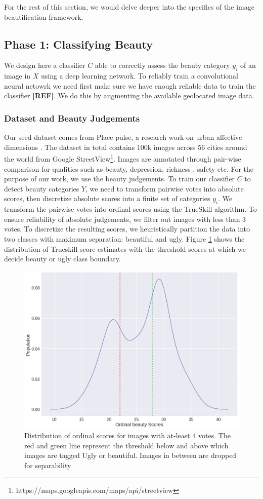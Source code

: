 For the rest of this section, we would delve deeper into the specifics of the image beautification framework. 

\subsection{Phase 1: Classifying Beauty}
We design here a classifier $C$  able to correctly assess the beauty category $y_i$ of an image in $X$ using a deep learning network. To reliably train a convolutional neural netowrk we need first make sure we have enough reliable data to train the classifier \textbf{[REF]}. We do this by augmenting the available geolocated image data. 

\subsubsection{Dataset and Beauty Judgements}
\label{sec:label}
Our seed dataset comes from Place pulse, a research work on urban affective dimensions \cite{dubey2016deep}. The dataset in total contains 100k images across 56 cities around the world from Google StreetView\footnote{https://maps.googleapis.com/maps/api/streetview}. Images are annotated through pair-wise comparison for qualities such as beauty, depression, richness , safety etc. For the purpose of our work, we use the beauty judgements. To train our classifier $C$ to detect beauty %
categories $Y$, we need to transform pairwise votes into absolute scores, then discretize absolute scores into a finite set of categories $y_i$. We transform the pairwise votes %
into ordinal scores using the TrueSkill \cite{herbrich2007trueskill} algorithm.  To ensure reliability of absolute judgements, we filter out images with less than 3 votes.
To discretize the resulting scores, we heuristically partition the data into two classes with maximum separation: beautiful and ugly. Figure \ref{fig:Trueskill} shows the distribution of Trueskill score estimates with the threshold scores at which we decide beauty or ugly class boundary. 

\begin{figure}[ht]
	\centering
	\includegraphics[width=0.7\columnwidth]{Plot/Trueskill.png}
	\caption{Distribution of ordinal scores for images with at-least 4 votes. The red and green line represent the threshold below and above which images are tagged Ugly or beautiful. Images in between are dropped for separability }
	\label{fig:Trueskill}
\end{figure}

